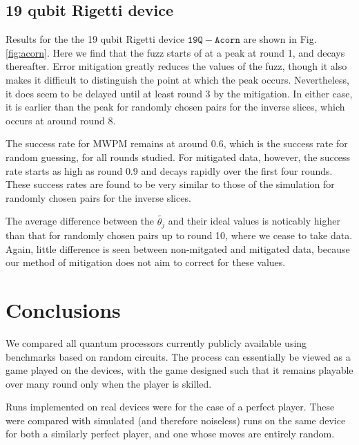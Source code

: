 \documentclass[aps,prl,twocolumn,showpacs,preprintnumbers]{revtex4-1}
\begin{document}
\subsection{19 qubit Rigetti device}  \label{subsec:acorn}

Results for the the 19 qubit Rigetti device $\mathtt{19Q-Acorn}$ are shown in Fig. \ref{fig:acorn}. Here we find that the fuzz starts of at a peak at round 1, and decays thereafter. Error mitigation greatly reduces the values of the fuzz, though it also makes it difficult to distinguish the point at which the peak occurs. Nevertheless, it does seem to be delayed until at least round 3 by the mitigation. In either case, it is earlier than the peak for randomly chosen pairs for the inverse slices, which occurs at around round 8.

The success rate for MWPM remains at around $0.6$, which is the success rate for random guessing, for all rounds studied. For mitigated data, however, the success rate starts as high as round $0.9$ and decays rapidly over the first four rounds. These success rates are found to be very similar to those of the simulation for randomly chosen pairs for the inverse slices.

The average difference between the $\tilde{\theta_j}$ and their ideal values is noticably higher than that for randomly chosen pairs up to round 10, where we cease to take data. Again, little difference is seen between non-mitgated and mitigated data, because our method of mitigation does not aim to correct for these values.





\section{Conclusions}

We compared all quantum processors currently publicly available using benchmarks based on random circuits. The process can essentially be viewed as a game played on the devices, with the game designed such that it remains playable over many round only when the player is skilled.

Runs implemented on real devices were for the case of a perfect player. These were compared with simulated (and therefore noiseless) runs on the same device for both a similarly perfect player, and one whose moves are entirely random.
\end{document}
